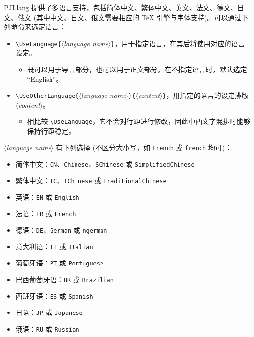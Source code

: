 \documentclass[allowbf,regionalref]{lebhart}
\providecommand{\meta}[1]{$\langle${\normalfont\itshape#1}$\rangle$}
\providecommand{\PJLlang}{\textsf{PJLlang}}
\begin{document}
\PJLlang{} 提供了多语言支持，包括简体中文、繁体中文、英文、法文、德文、日文、俄文 (其中中文、日文、俄文需要相应的 \TeX{} 引擎与字体支持)。可以通过下列命令来选定语言：
\begin{itemize}
    \item \lstinline|\UseLanguage{|\meta{language name}\lstinline|}|，用于指定语言，在其后将使用对应的语言设定。
    \begin{itemize}
        \item 既可以用于导言部分，也可以用于正文部分。在不指定语言时，默认选定 “English”。
    \end{itemize}
    \item \lstinline|\UseOtherLanguage{|\meta{language name}\lstinline|}{|\meta{content}\lstinline|}|，用指定的语言的设定排版 \meta{content}。
    \begin{itemize}
        \item 相比较 \lstinline|\UseLanguage|，它不会对行距进行修改，因此中西文字混排时能够保持行距稳定。
    \end{itemize}
\end{itemize}

\meta{language name} 有下列选择 (不区分大小写，如 \texttt{French} 或 \texttt{french} 均可)：
\begin{itemize}
    \item 简体中文：\texttt{CN}、\texttt{Chinese}、\texttt{SChinese} 或 \texttt{SimplifiedChinese}
    \item 繁体中文：\texttt{TC}、\texttt{TChinese} 或 \texttt{TraditionalChinese}
    \item 英语：\texttt{EN} 或 \texttt{English}
    \item 法语：\texttt{FR} 或 \texttt{French}
    \item 德语：\texttt{DE}、\texttt{German} 或 \texttt{ngerman}
    \item 意大利语：\texttt{IT} 或 \texttt{Italian}
    \item 葡萄牙语：\texttt{PT} 或 \texttt{Portuguese}
    \item 巴西葡萄牙语：\texttt{BR} 或 \texttt{Brazilian}
    \item 西班牙语：\texttt{ES} 或 \texttt{Spanish}
    \item 日语：\texttt{JP} 或 \texttt{Japanese}
    \item 俄语：\texttt{RU} 或 \texttt{Russian}
\end{itemize}
\end{document}
